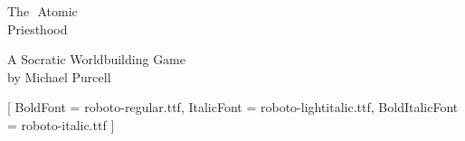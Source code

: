 \documentclass[a6paper, 11pt, parskip=half, DIV=15]{scrartcl}
\begin{document}
\begin{titlepage}
\enlargethispage{3.0\baselineskip}
\setmainfont[Scale=1.15]{Stalinist One}
\huge
\begin{center}
\vspace*{-0.5\baselineskip}
The\ \,Atomic\\[1ex]
Priesthood

\vfill

\tiny\phantom{a}


\vfill

\setmainfont[Scale=1.1]{TerminusTTFWindows}\Large
\setmainfont[Scale=1.0]{Long Cang}\huge
A Socratic Worldbuilding Game\\%
by Michael Purcell
\end{center}
\end{titlepage}
\thispagestyle{empty}
\enlargethispage{1.75\baselineskip}
\setmainfont{TerminusTTFWindows}\normalsize
\setmainfont{Roboto-Light}[
	BoldFont = roboto-regular.ttf,
	ItalicFont = roboto-lightitalic.ttf,
	BoldItalicFont = roboto-italic.ttf
]\normalsize
\noindent 
\itshape
\end{document}
